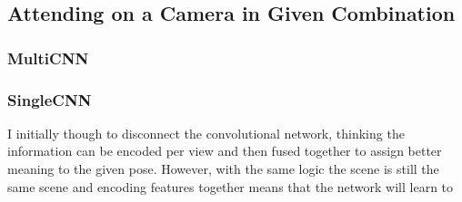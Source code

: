 \subsection{Attending on a Camera in Given Combination}
\subsubsection{MultiCNN}
\subsubsection{SingleCNN}
I initially though to disconnect the convolutional network, thinking the information can be encoded per view and then fused together to assign better meaning to the given pose. However, with the same logic the scene is still the same scene and encoding features together means that the network will learn to 